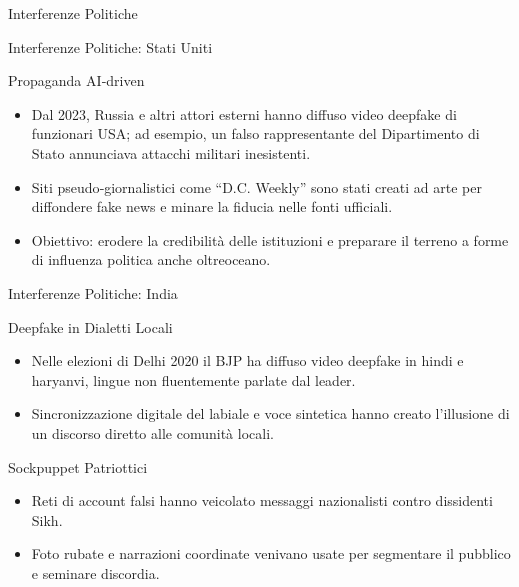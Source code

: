 \documentclass[12pt]{beamer}
\begin{document}
\begin{frame}
\Huge
\begin{center}
Interferenze Politiche
\end{center}
\end{frame}


\begin{frame}{Interferenze Politiche: Stati Uniti}
  \small
  \begin{alertblock}{Propaganda AI‐driven}
    \begin{itemize}
      \item Dal 2023, Russia e altri attori esterni hanno diffuso video deepfake di funzionari USA; ad esempio, un falso rappresentante del Dipartimento di Stato annunciava attacchi militari inesistenti.\cite{npr_fake_us}
      \item Siti pseudo‐giornalistici come “D.C. Weekly” sono stati creati ad arte per diffondere fake news e minare la fiducia nelle fonti ufficiali.\cite{washpost_fake}
      \item Obiettivo: erodere la credibilità delle istituzioni e preparare il terreno a forme di influenza politica anche oltreoceano.
    \end{itemize}
  \end{alertblock}
\end{frame}

\begin{frame}{Interferenze Politiche: India}
  \small
  \begin{alertblock}{Deepfake in Dialetti Locali}
    \begin{itemize}
      \item Nelle elezioni di Delhi 2020 il BJP ha diffuso video deepfake in hindi e haryanvi, lingue non fluentemente parlate dal leader.\cite{india_deepfake}
      \item Sincronizzazione digitale del labiale e voce sintetica hanno creato l’illusione di un discorso diretto alle comunità locali.
    \end{itemize}
  \end{alertblock}
  \begin{alertblock}{Sockpuppet Patriottici}
    \begin{itemize}
      \item Reti di account falsi hanno veicolato messaggi nazionalisti contro dissidenti Sikh.\cite{bbc_fake_sikh}
      \item Foto rubate e narrazioni coordinate venivano usate per segmentare il pubblico e seminare discordia.
    \end{itemize}
  \end{alertblock}
\end{frame}
\end{document}
